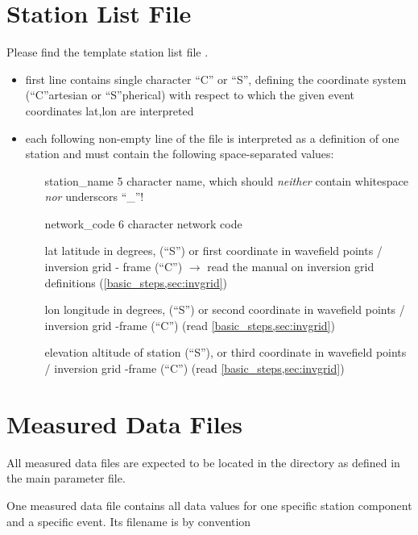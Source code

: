 \section{Station List File} \label{files,sec:station_list}
%
Please find the template station list file .

\begin{itemize}
\item first line contains single character ``C'' or ``S'', defining the coordinate system (``C''artesian or ``S''pherical)
  with respect to which the given event coordinates lat,lon are interpreted
\item each following non-empty line of the file is interpreted as a definition of one station and must 
  contain the following space-separated values:
  \begin{itemize}
  \item[station\_name] 5 character name, which should \emph{neither} contain whitespace \emph{nor} underscors ``\_''!
  \item[network\_code] 6 character network code
  \item[lat] latitude in degrees,  (``S'') or first coordinate in 
    wavefield points / inversion grid - frame (``C'') $\rightarrow$  read the manual on inversion grid definitions 
    (\ref{basic_steps,sec:invgrid})
  \item[lon] longitude in degrees,  (``S'') or second  coordinate in 
    wavefield points / inversion grid -frame (``C'') (read \ref{basic_steps,sec:invgrid})
  \item[elevation] altitude of station (``S''), or third coordinate in wavefield points / inversion grid -frame (``C'') (read \ref{basic_steps,sec:invgrid})
  \end{itemize}
\end{itemize}
%
\section{Measured Data Files} \label{files,sec:measured_data}
%
All measured data files are expected to be located in the directory  as defined
in the main parameter file.

One measured data file contains all data values for one specific station component and a specific event.
Its filename is by convention 

